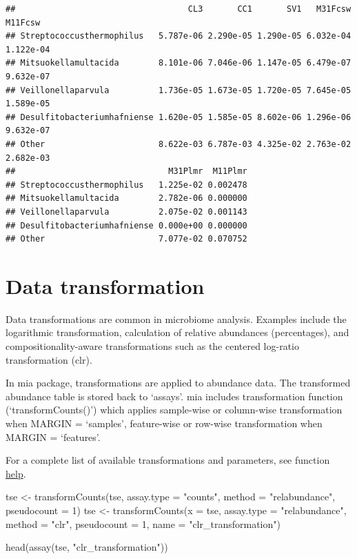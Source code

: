 \documentclass[
]{book}
\newenvironment{Shaded}{\begin{snugshade}}{\end{snugshade}}
\newcommand{\AttributeTok}[1]{\textcolor[rgb]{0.77,0.63,0.00}{#1}}
\newcommand{\DecValTok}[1]{\textcolor[rgb]{0.00,0.00,0.81}{#1}}
\newcommand{\FunctionTok}[1]{\textcolor[rgb]{0.00,0.00,0.00}{#1}}
\newcommand{\NormalTok}[1]{#1}
\newcommand{\OtherTok}[1]{\textcolor[rgb]{0.56,0.35,0.01}{#1}}
\newcommand{\StringTok}[1]{\textcolor[rgb]{0.31,0.60,0.02}{#1}}
\begin{document}
\begin{verbatim}
##                                   CL3       CC1       SV1   M31Fcsw   M11Fcsw
## Streptococcusthermophilus   5.787e-06 2.290e-05 1.290e-05 6.032e-04 1.122e-04
## Mitsuokellamultacida        8.101e-06 7.046e-06 1.147e-05 6.479e-07 9.632e-07
## Veillonellaparvula          1.736e-05 1.673e-05 1.720e-05 7.645e-05 1.589e-05
## Desulfitobacteriumhafniense 1.620e-05 1.585e-05 8.602e-06 1.296e-06 9.632e-07
## Other                       8.622e-03 6.787e-03 4.325e-02 2.763e-02 2.682e-03
##                               M31Plmr  M11Plmr
## Streptococcusthermophilus   1.225e-02 0.002478
## Mitsuokellamultacida        2.782e-06 0.000000
## Veillonellaparvula          2.075e-02 0.001143
## Desulfitobacteriumhafniense 0.000e+00 0.000000
## Other                       7.077e-02 0.070752
\end{verbatim}

\hypertarget{assay-transform}{%
\section{Data transformation}\label{assay-transform}}

Data transformations are common in microbiome analysis. Examples
include the logarithmic transformation, calculation of relative
abundances (percentages), and compositionality-aware transformations
such as the centered log-ratio transformation (clr).

In mia package, transformations are applied to abundance data. The transformed
abundance table is stored back to `assays'. mia includes transformation
function (`transformCounts()') which applies sample-wise or column-wise transformation when MARGIN = `samples', feature-wise or row-wise transformation when MARGIN = `features'.

For a complete list of available transformations and parameters, see function
\href{https://microbiome.github.io/mia/reference/transformCounts.html}{help}.

\begin{Shaded}
\begin{Highlighting}[]
\NormalTok{tse }\OtherTok{\textless{}{-}} \FunctionTok{transformCounts}\NormalTok{(tse, }\AttributeTok{assay.type =} \StringTok{"counts"}\NormalTok{, }\AttributeTok{method =} \StringTok{"relabundance"}\NormalTok{, }\AttributeTok{pseudocount =} \DecValTok{1}\NormalTok{)}
\NormalTok{tse }\OtherTok{\textless{}{-}} \FunctionTok{transformCounts}\NormalTok{(}\AttributeTok{x =}\NormalTok{ tse, }\AttributeTok{assay.type =} \StringTok{"relabundance"}\NormalTok{, }\AttributeTok{method =} \StringTok{"clr"}\NormalTok{, }
                        \AttributeTok{pseudocount =} \DecValTok{1}\NormalTok{, }\AttributeTok{name =} \StringTok{"clr\_transformation"}\NormalTok{)}

\FunctionTok{head}\NormalTok{(}\FunctionTok{assay}\NormalTok{(tse, }\StringTok{"clr\_transformation"}\NormalTok{))}
\end{Highlighting}
\end{Shaded}
\end{document}
